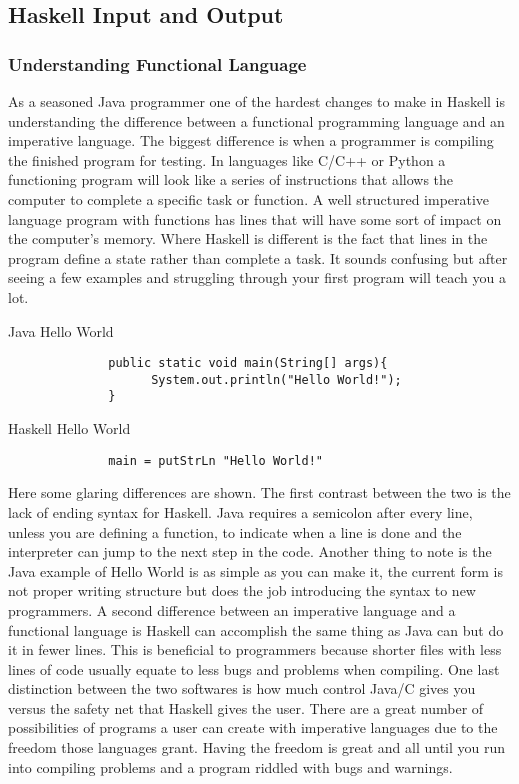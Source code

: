 \documentclass{article}
\begin{document}
\subsection{Haskell Input and Output}
    \subsubsection{Understanding Functional Language}
    As a seasoned Java programmer one of the hardest changes to make in Haskell is understanding the difference between a functional programming language and an imperative language. The biggest difference is when a programmer is compiling the finished program for testing. In languages like C/C++ or Python a functioning program will look like a series of instructions that allows the computer to complete a specific task or function. A well structured imperative language program with functions has lines that will have some sort of impact on the computer's memory. Where Haskell is different is the fact that lines in the program define a state rather than complete a task. It sounds confusing but after seeing a few examples and struggling through your first program will teach you a lot. 
    
    \medskip
    \caption{Java Hello World}
    \begin{lstlisting}
              public static void main(String[] args){
                    System.out.println("Hello World!");
              }
    \end{lstlisting}
    
    \medskip
    \caption{Haskell Hello World}
    \begin{lstlisting}
              main = putStrLn "Hello World!"
    \end{lstlisting}
    
    \medskip
    Here some glaring differences are shown. The first contrast between the two is the lack of ending syntax for Haskell. Java requires a semicolon after every line, unless you are defining a function, to indicate when a line is done and the interpreter can jump to the next step in the code. Another thing to note is the Java example of Hello World is as simple as you can make it, the current form is not proper writing structure but does the job introducing the syntax to new programmers. A second difference between an imperative language and a functional language is Haskell can accomplish the same thing as Java can but do it in fewer lines. This is beneficial to programmers because shorter files with less lines of code usually equate to less bugs and problems when compiling. One last distinction between the two softwares is how much control Java/C gives you versus the safety net that Haskell gives the user. There are a great number of possibilities of programs a user can create with imperative languages due to the freedom those languages grant. Having the freedom is great and all until you run into compiling problems and a program riddled with bugs and warnings. 
    
\end{document}
